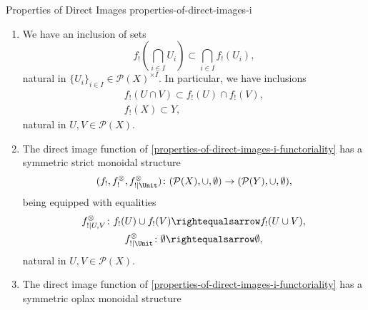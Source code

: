 \begin{proposition}{Properties of Direct Images \rmI}{properties-of-direct-images-i}
\begin{enumerate}
            \[
                \begin{gathered}
                    f_{!}(U)\cup f_{!}(V)                  = f_{!}(U\cup V),\\
                    f_{!}(\emptyset)                       = \emptyset,
                \end{gathered}
            \]%
            natural in $U,V\in\mathcal{P}(X)$.
        \item\label{properties-of-direct-images-i-oplax-preservation-of-limits}We have an inclusion of sets
            \[
                f_{!}\left(\bigcap_{i\in I}U_{i}\right)%
                \subset%
                \bigcap_{i\in I}f_{!}(U_{i}),%
            \]%
            natural in $\{U_{i}\}_{i\in I}\in\mathcal{P}(X)^{\times I}$. In particular, we have inclusions%
            \[
                \begin{gathered}
                    f_{!}(U\cap V) \subset f_{!}(U)\cap f_{!}(V),\\
                    f_{!}(X)        \subset Y,
                \end{gathered}
            \]%
            natural in $U,V\in\mathcal{P}(X)$.
        \item\label{properties-of-direct-images-i-symmetric-strict-monoidality-with-respect-to-unions}The direct image function of \cref{properties-of-direct-images-i-functoriality} has a symmetric strict monoidal structure
            \[
                (f_{!},f^{\otimes}_{!},f^{\otimes}_{!|\Unit})
                \colon
                (\mathcal{P}(X),\cup,\emptyset)
                \to
                (\mathcal{P}(Y),\cup,\emptyset),
            \]%
            being equipped with equalities%
            \[
                \begin{gathered}
                    f^{\otimes}_{!|U,V}   \colon f_{!}(U)\cup f_{!}(V) \rightequalsarrow f_{!}(U\cup V),\\
                    f^{\otimes}_{!|\Unit} \colon \emptyset             \rightequalsarrow \emptyset,
                \end{gathered}
            \]%
            natural in $U,V\in\mathcal{P}(X)$.
        \item\label{properties-of-direct-images-i-symmetric-oplax-monoidality-with-respect-to-intersections}The direct image function of \cref{properties-of-direct-images-i-functoriality} has a symmetric oplax monoidal structure

\end{enumerate}
\end{proposition}
